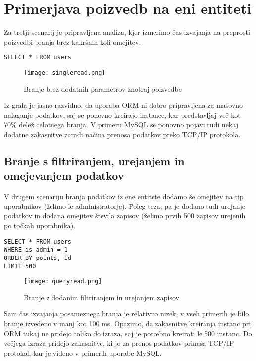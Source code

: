 \documentclass[a4paper,12pt,openright]{book}
\begin{document}
    \section{Primerjava poizvedb na eni entiteti}

    Za tretji scenarij je pripravljena analiza, kjer izmerimo čas izvajanja na preprosti poizvedbi branja brez kakršnih koli omejitev.
    
\begin{verbatim}
SELECT * FROM users
\end{verbatim}
    

    \begin{figure}[H]
        \centerline{\texttt{[image: singleread.png]}}
        \caption{Branje brez dodatnih parametrov znotraj poizvedbe}
        \label{branje}
    \end{figure}

    \noindent
    Iz grafa je jasno razvidno, da uporaba ORM ni dobro pripravljena za masovno nalaganje podatkov, saj se ponovno kreirajo instance, kar predstavljaj več kot 70\% delež celotnega branja. V primeru MySQL se ponovno pojavi tudi nekaj dodatne zakasnitve zaradi načina prenosa podatkov preko TCP/IP protokola.

    \subsection{Branje s filtriranjem, urejanjem in omejevanjem podatkov}

    V drugem scenariju branja podatkov iz ene entitete dodamo še omejitev na tip uporabnikov (želimo le administratorje). Poleg tega, pa je dodano tudi urejanje podatkov in dodana omejitev števila zapisov (želimo prvih 500 zapisov urejenih po točkah uporabnika).

\begin{verbatim}
SELECT * FROM users
WHERE is_admin = 1
ORDER BY points, id
LIMIT 500
\end{verbatim}
    
    \begin{figure}[H]
        \centerline{\texttt{[image: queryread.png]}}
        \caption{Branje z dodanim filtriranjem in urejanjem zapisov}
        \label{queryread}
    \end{figure}

    \noindent
    Sam čas izvajanja posameznega branja je relativno nizek, v vseh primerih je bilo branje izvedeno v manj kot 100 ms. Opazimo, da zakasnitve kreiranja instanc pri ORM tukaj ne pridejo toliko do izraza, saj je potrebno kreirati le 500 instanc. Do večjega izraza pridejo zakasnitve, ki jo za prenos podatkov prinaša TCP/IP protokol, kar je videno v primerih uporabe MySQL.
\end{document}
